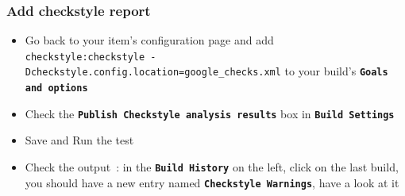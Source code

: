 \documentclass{article}
\begin{document}
\subsubsection{Add checkstyle report}
\begin{itemize}
\item Go back to your item's configuration page and add \\
\texttt{checkstyle:checkstyle -Dcheckstyle.config.location=google\_checks.xml} to your build's \textbf{\texttt{Goals and options}}
\item Check the \textbf{\texttt{Publish Checkstyle analysis results}} box in \textbf{\texttt{Build Settings}}
\item Save and Run the test
\item Check the output~: in the \textbf{\texttt{Build History}} on the left, click on the last build, you should have a new entry named \textbf{\texttt{Checkstyle Warnings}}, have a look at it
\end{itemize}

\clearpage
\end{document}
